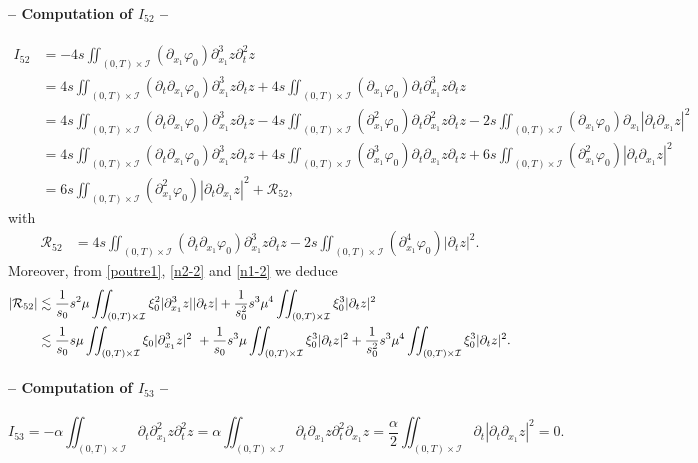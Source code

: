 \documentclass[a4paper, 12pt]{article}
\theoremstyle{plain}
\theoremstyle{definition}
\numberwithin{theorem}{section}
\numberwithin{equation}{section}
\begin{document}
{\paragraph{-- Computation of $I_{52}$ --}
\begin{align*}
I_{52}&=-4s\iint_{(0,T)\times\mathcal{I}}(\partial_{x_1}\varphi_0)\partial^3_{x_1}z\partial^2_tz\\
&=4s\iint_{(0,T)\times\mathcal{I}}(\partial_t\partial_{x_1}\varphi_0)\partial^3_{x_1}z\partial_tz+4s\iint_{(0,T)\times\mathcal{I}}(\partial_{x_1}\varphi_0)\partial_t\partial^3_{x_1}z\partial_tz\\
&=4s\iint_{(0,T)\times\mathcal{I}}(\partial_t\partial_{x_1}\varphi_0)\partial^3_{x_1}z\partial_tz-4s\iint_{(0,T)\times\mathcal{I}}(\partial^2_{x_1}\varphi_0)\partial_t\partial^2_{x_1}z\partial_tz-2s\iint_{(0,T)\times\mathcal{I}}(\partial_{x_1}\varphi_0)\partial_{x_1}|\partial_t\partial_{x_1}z|^2\\
&=4s\iint_{(0,T)\times\mathcal{I}}(\partial_t\partial_{x_1}\varphi_0)\partial^3_{x_1}z\partial_tz+4s\iint_{(0,T)\times\mathcal{I}}(\partial^3_{x_1}\varphi_0)\partial_t\partial_{x_1}z\partial_tz+6s\iint_{(0,T)\times\mathcal{I}}(\partial^2_{x_1}\varphi_0)|\partial_t\partial_{x_1}z|^2\\
&=6s\iint_{(0,T)\times\mathcal{I}}(\partial^2_{x_1}\varphi_0)|\partial_t\partial_{x_1}z|^2+\mathcal{R}_{52},
\end{align*}
with
\begin{align*}
\mathcal{R}_{52}
&=4s\iint_{(0,T)\times\mathcal{I}}(\partial_t\partial_{x_1}\varphi_0)\partial^3_{x_1}z\partial_tz-2s\iint_{(0,T)\times\mathcal{I}}(\partial^4_{x_1}\varphi_0)|\partial_tz|^2.
\end{align*}
Moreover, from \eqref{poutre1}, \eqref{n2-2} and \eqref{n1-2} we deduce
\begin{align}
|\mathcal{R}_{52}|
&\lesssim \frac{1}{s_0}s^2\mu \iint_{(0,T)\times\mathcal{I}}\xi_0^2|\partial^3_{x_1}z||\partial_tz|+\frac{1}{s_0^2}s^3\mu^4\iint_{(0,T)\times\mathcal{I}}\xi_0^3|\partial_tz|^2\notag \\
&\lesssim \frac{1}{s_0}s\mu \iint_{(0,T)\times\mathcal{I}}\xi_0|\partial^3_{x_1}z|^2~+\frac{1}{s_0}s^3\mu \iint_{(0,T)\times\mathcal{I}}\xi_0^3|\partial_tz|^2+\frac{1}{s_0^2}s^3\mu^4\iint_{(0,T)\times\mathcal{I}}\xi_0^3|\partial_tz|^2.\label{EstR52}
\end{align}
\paragraph{-- Computation of $I_{53}$ --}
$$I_{53}=-\alpha\iint_{(0,T)\times\mathcal{I}}\partial_t\partial^2_{x_1}z\partial^2_tz=\alpha\iint_{(0,T)\times\mathcal{I}}\partial_t\partial_{x_1}z\partial^2_t\partial_{x_1}z=\frac{\alpha}{2}\iint_{(0,T)\times\mathcal{I}}\partial_t|\partial_t\partial_{x_1}z|^2=0.$$
}
\end{document}
